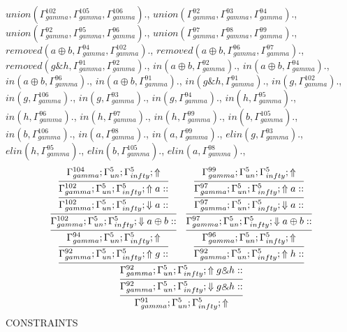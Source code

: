 \documentclass[a4paper, 11pt]{article}
\begin{document}
$union(\Gamma_{gamma}^{102}, \Gamma_{gamma}^{105}, \Gamma_{gamma}^{106}).$, $union(\Gamma_{gamma}^{92}, \Gamma_{gamma}^{93}, \Gamma_{gamma}^{94}).$, $union(\Gamma_{gamma}^{92}, \Gamma_{gamma}^{95}, \Gamma_{gamma}^{96}).$, $union(\Gamma_{gamma}^{97}, \Gamma_{gamma}^{98}, \Gamma_{gamma}^{99}).$, $removed(a \oplus b, \Gamma_{gamma}^{94}, \Gamma_{gamma}^{102}).$, $removed(a \oplus b, \Gamma_{gamma}^{96}, \Gamma_{gamma}^{97}).$, $removed(g \binampersand h, \Gamma_{gamma}^{91}, \Gamma_{gamma}^{92}).$, $in(a \oplus b, \Gamma_{gamma}^{92}).$, $in(a \oplus b, \Gamma_{gamma}^{94}).$, $in(a \oplus b, \Gamma_{gamma}^{96}).$, $in(a \oplus b, \Gamma_{gamma}^{91}).$, $in(g \binampersand h, \Gamma_{gamma}^{91}).$, $in(g, \Gamma_{gamma}^{102}).$, $in(g, \Gamma_{gamma}^{106}).$, $in(g, \Gamma_{gamma}^{93}).$, $in(g, \Gamma_{gamma}^{94}).$, $in(h, \Gamma_{gamma}^{95}).$, $in(h, \Gamma_{gamma}^{96}).$, $in(h, \Gamma_{gamma}^{97}).$, $in(h, \Gamma_{gamma}^{99}).$, $in(b, \Gamma_{gamma}^{105}).$, $in(b, \Gamma_{gamma}^{106}).$, $in(a, \Gamma_{gamma}^{98}).$, $in(a, \Gamma_{gamma}^{99}).$, $elin(g, \Gamma_{gamma}^{93}).$, $elin(h, \Gamma_{gamma}^{95}).$, $elin(b, \Gamma_{gamma}^{105}).$, $elin(a, \Gamma_{gamma}^{98}).$, 
{\small
\[
\infer{\Gamma_{ gamma}^{91} ; \Gamma_{un}^{5} ; \Gamma_{ infty}^{5} ;  \Uparrow }
{\infer{\Gamma_{ gamma}^{92} ; \Gamma_{un}^{5} ; \Gamma_{ infty}^{5} ;  \Downarrow g \binampersand h :: }
{\infer{\Gamma_{ gamma}^{92} ; \Gamma_{un}^{5} ; \Gamma_{ infty}^{5} ;  \Uparrow g \binampersand h :: }
{\infer{\Gamma_{ gamma}^{92} ; \Gamma_{un}^{5} ; \Gamma_{ infty}^{5} ;  \Uparrow g :: }
{\infer{\Gamma_{ gamma}^{94} ; \Gamma_{un}^{5} ; \Gamma_{ infty}^{5} ;  \Uparrow }
{\infer{\Gamma_{ gamma}^{102} ; \Gamma_{un}^{5} ; \Gamma_{ infty}^{5} ;  \Downarrow a \oplus b :: }
{\infer{\Gamma_{ gamma}^{102} ; \Gamma_{un}^{5} ; \Gamma_{ infty}^{5} ;  \Downarrow a :: }
{\infer{\Gamma_{ gamma}^{102} ; \Gamma_{un}^{5} ; \Gamma_{ infty}^{5} ;  \Uparrow a :: }
{\Gamma_{ gamma}^{104} ; \Gamma_{un}^{5} ; \Gamma_{ infty}^{5} ;  \Uparrow }}}}}
&
\infer{\Gamma_{ gamma}^{92} ; \Gamma_{un}^{5} ; \Gamma_{ infty}^{5} ;  \Uparrow h :: }
{\infer{\Gamma_{ gamma}^{96} ; \Gamma_{un}^{5} ; \Gamma_{ infty}^{5} ;  \Uparrow }
{\infer{\Gamma_{ gamma}^{97} ; \Gamma_{un}^{5} ; \Gamma_{ infty}^{5} ;  \Downarrow a \oplus b :: }
{\infer{\Gamma_{ gamma}^{97} ; \Gamma_{un}^{5} ; \Gamma_{ infty}^{5} ;  \Downarrow a :: }
{\infer{\Gamma_{ gamma}^{97} ; \Gamma_{un}^{5} ; \Gamma_{ infty}^{5} ;  \Uparrow a :: }
{\Gamma_{ gamma}^{99} ; \Gamma_{un}^{5} ; \Gamma_{ infty}^{5} ;  \Uparrow }}}}}}}}
\]
}
CONSTRAINTS
\end{document}
